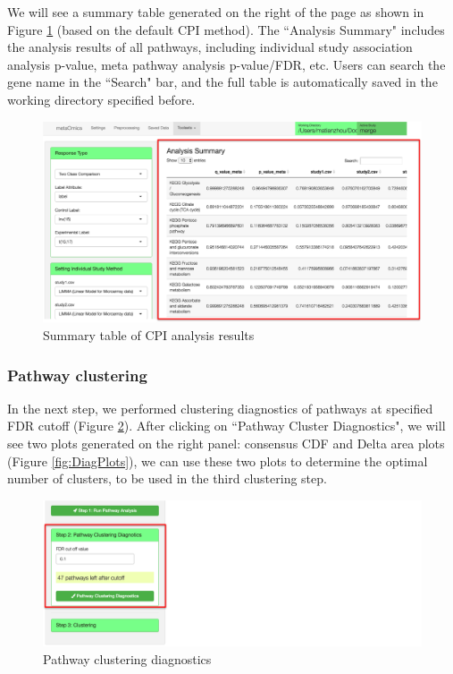 We will see a summary table generated on the right of the page as shown in Figure \ref{fig:CPISummary} (based on the default CPI method). The ``Analysis Summary" includes the analysis results of all pathways, including individual study association analysis p-value, meta pathway analysis p-value/FDR, etc. Users can search the gene name in the ``Search" bar, and the full table is automatically saved in the working directory specified before.  

\begin{figure}[H]
\begin{center}
\includegraphics[scale=0.45]{./figure/metaPath/CPISummary}
\caption{Summary table of CPI analysis results}
\label{fig:CPISummary}
\end{center}
\end{figure}

\subsubsection{Pathway clustering}

In the next step, we performed clustering diagnostics of pathways at specified FDR cutoff (Figure \ref{fig:ClustDiag}). After clicking on ``Pathway Cluster Diagnostics", we will see two plots generated on the right panel: consensus CDF and Delta area plots (Figure \ref{fig:DiagPlots}), we can use these two plots to determine the optimal number of clusters, to be used in the third clustering step.  

\begin{figure}[H]
\begin{center}
\includegraphics[scale=0.45]{./figure/metaPath/ClustDiag}
\caption{Pathway clustering diagnostics}
\label{fig:ClustDiag}
\end{center}
\end{figure}

